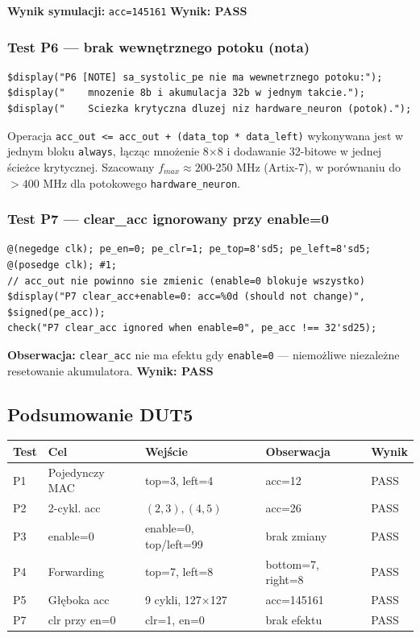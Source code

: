 \documentclass[12pt,a4paper]{article}
\begin{document}
\textbf{Wynik symulacji:} \texttt{acc=145161} \quad \textbf{Wynik: PASS}

\subsubsection*{Test P6 — brak wewnętrznego potoku (nota)}

\begin{lstlisting}
$display("P6 [NOTE] sa_systolic_pe nie ma wewnetrznego potoku:");
$display("    mnozenie 8b i akumulacja 32b w jednym takcie.");
$display("    Sciezka krytyczna dluzej niz hardware_neuron (potok).");
\end{lstlisting}

\begin{infobox}
Operacja \texttt{acc\_out <= acc\_out + (data\_top * data\_left)} wykonywana jest w jednym bloku \texttt{always}, łącząc mnożenie 8×8 i dodawanie 32-bitowe w jednej ścieżce krytycznej. Szacowany $f_{max} \approx 200$-250 MHz (Artix-7), w porównaniu do $>400$ MHz dla potokowego \texttt{hardware\_neuron}.
\end{infobox}

\subsubsection*{Test P7 — clear\_acc ignorowany przy enable=0}

\begin{lstlisting}
@(negedge clk); pe_en=0; pe_clr=1; pe_top=8'sd5; pe_left=8'sd5;
@(posedge clk); #1;
// acc_out nie powinno sie zmienic (enable=0 blokuje wszystko)
$display("P7 clear_acc+enable=0: acc=%0d (should not change)", $signed(pe_acc));
check("P7 clear_acc ignored when enable=0", pe_acc !== 32'sd25);
\end{lstlisting}

\textbf{Obserwacja:} \texttt{clear\_acc} nie ma efektu gdy \texttt{enable=0} — niemożliwe niezależne resetowanie akumulatora. \textbf{Wynik: PASS}

\subsection{Podsumowanie DUT5}

\begin{center}
\begin{tabular}{lllll}
\toprule
\textbf{Test} & \textbf{Cel} & \textbf{Wejście} & \textbf{Obserwacja} & \textbf{Wynik} \\
\midrule
P1 & Pojedynczy MAC & top=3, left=4 & acc=12 & PASS \\
P2 & 2-cykl. acc & $(2,3),(4,5)$ & acc=26 & PASS \\
P3 & enable=0 & enable=0, top/left=99 & brak zmiany & PASS \\
P4 & Forwarding & top=7, left=8 & bottom=7, right=8 & PASS \\
P5 & Głęboka acc & 9 cykli, 127×127 & acc=145161 & PASS \\
P7 & clr przy en=0 & clr=1, en=0 & brak efektu & PASS \\
\bottomrule
\end{tabular}
\end{center}
\end{document}
